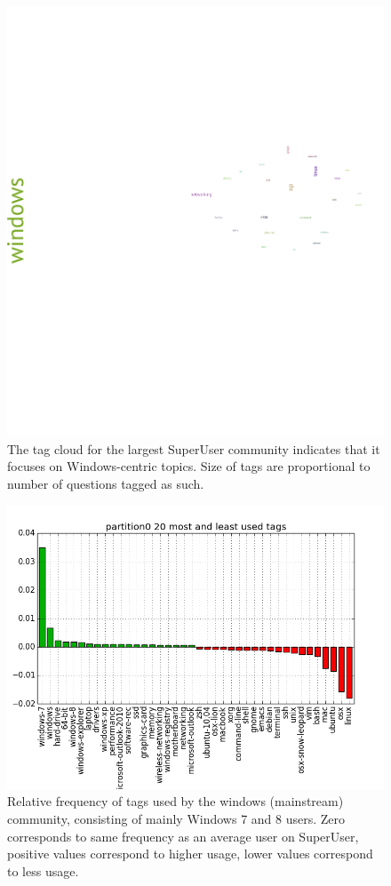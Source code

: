 \documentclass[a4paper]{article}
\begin{document}
\begin{figure}
\centering
\includegraphics[width=\columnwidth]{partition0}
\caption{The tag cloud for the largest SuperUser community indicates that it focuses on Windows-centric topics. Size of tags are proportional to number of questions tagged as such.}
\label{fig:windows-tags}
\end{figure}

\begin{figure}
\centering
\includegraphics[width=\columnwidth]{partition0-tags}
\caption{Relative frequency of tags used by the windows (mainstream) community, consisting of mainly Windows 7 and 8 users. Zero corresponds to same frequency as an average user on SuperUser, positive values correspond to higher usage, lower values correspond to less usage.}
\label{fig:windows-tags0}
\end{figure}
\end{document}
